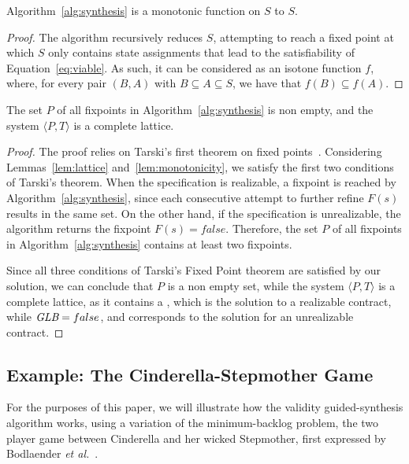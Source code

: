\begin{lemma} Algorithm~\ref{alg:synthesis} is a monotonic function on $S$ to
$S$.
\label{lem:monotonicity}
\end{lemma}
\begin{proof}
The algorithm recursively reduces $S$, attempting to reach a fixed point
at which $S$ only contains state assignments that lead to the satisfiability of
Equation~\ref{eq:viable}. As such, it can be considered as an isotone function
$f$, where, for every pair $(B,A)$ with $B \subseteq A \subseteq S$, we have that
$f(B) \subseteq f(A)$.
\end{proof}

\begin{theorem}
The set $P$ of all fixpoints in Algorithm~\ref{alg:synthesis} is non
empty, and the system $\langle P, T \rangle$ is a complete lattice.
\label{thm:fixpoint}
\end{theorem}
\begin{proof}
The proof relies on Tarski's first theorem on fixed
points~\cite{tarski1955lattice}.
Considering Lemmas~\ref{lem:lattice} and~\ref{lem:monotonicity}, we satisfy the first two
conditions of Tarski's theorem. When the specification is realizable, a
fixpoint is reached by Algorithm~\ref{alg:synthesis}, since each consecutive
attempt to further refine $F(s)$ results in the same set. On the other hand, if
the specification is unrealizable, the algorithm returns the fixpoint $F(s) = false$. Therefore, the
set $P$ of all fixpoints in Algorithm~\ref{alg:synthesis} contains at least two
fixpoints.

Since all three conditions of Tarski's Fixed Point theorem are satisfied by our
solution, we can conclude that $P$ is a non empty set, while the system
$\langle P, T \rangle$ is a complete lattice, as it contains a \lub, which is
the solution to a realizable contract, while $\textit {GLB} = false$, and corresponds to
the solution for an unrealizable contract.
\end{proof}


\subsection{Example: The Cinderella-Stepmother Game}
\label{sec:example}

For the purposes of this paper, we will illustrate how the validity
guided-synthesis algorithm works, using a variation of the minimum-backlog
problem, the two player game between Cinderella and her wicked
Stepmother, first  expressed by Bodlaender \textit{et
al.}~\cite{bodlaender2012cinderella}.


